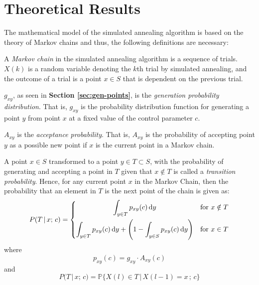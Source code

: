 \section{Theoretical Results}
\label{sec: methodology}
The mathematical model of the simulated annealing algorithm is based on the theory of Markov chains and thus, the following definitions are necessary: \vspace{5pt}

\begin{definition}
A \textit{Markov chain} in the simulated annealing algorithm is a sequence of trials. $X(k)$ is a random variable denoting the $k$th trial by simulated annealing, and the outcome of a trial is a point $x \in S$ that is dependent on the previous trial.
\end{definition}

\begin{definition}
$g_{xy}$, as seen in \textbf{Section \ref{sec:gen-points}}, is the \textit{generation probability distribution}. That is, $g_{xy}$ is the probability distribution function for generating a point $y$ from point $x$ at a fixed value of the control parameter $c$.
\end{definition}

\begin{definition}
$A_{xy}$ is the \textit{acceptance probability}. That is, $A_{xy}$ is the probability of accepting point $y$ as a possible new point if $x$ is the current point in a Markov chain.
\end{definition}

\begin{definition}
A point $x \in S$ transformed to a point $y \in T \subset S$,  with the probability of generating and accepting a point in $T$ given that $x \notin T$ is called a \textit{transition probability}. Hence, for any current point $x$ in the Markov Chain, then the probability that an element in $T$ is the next point of the chain is given as:
\begin{equation}
    P(T \, | \, x; \, c) = \begin{dcases}
        \hfil \int_{y \in T} p_{xy}(c) \, \dd y & \text{for } x \notin T \\
        \int_{y \in T} p_{xy}(c) \, \dd y + \Bigg( 1 - \int_{y \in S} p_{xy}(c) \, \dd y \Bigg) & \text{for } x \in T \\
    \end{dcases}
\end{equation}
where
\begin{equation}
    p_{xy}(c) = g_{xy} \cdot A_{xy}(c)
\end{equation}
and
\begin{equation}
    P(T \, | \, x; \, c) = \mathbb{P}\{ X(l) \in T \, | \, X(l-1) = x\, ;\, c \}
\end{equation}
\end{definition}


